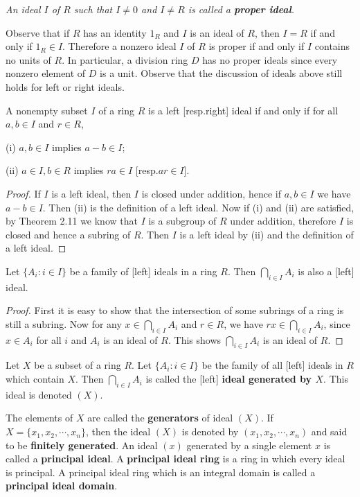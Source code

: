 \begin{note}\em
An ideal $I$ of $R$ such that $I\ne 0$ and $I\ne R$ is called a \textbf{proper ideal}.
\end{note} Observe that if $R$ has an identity $1_R$ and $I$ is an ideal of $R$, then $I=R$ if and only if $1_R\in I$. Therefore a nonzero ideal $I$ of $R$ is proper if and only if $I$ contains no units of $R$. In particular, a division ring $D$ has no proper ideals since every nonzero element of $D$ is a unit. Observe that the discussion of ideals above still holds for left or right ideals.
\begin{theorem}
A nonempty subset $I$ of a ring $R$ is a left [resp.right] ideal if and only if for all $a,b\in I$ and $r\in R$,\par
(i) $a,b\in I$ implies $a-b\in I$;\par
(ii) $a\in I,b\in R$ implies $ra\in I$ [resp.$ar\in I$].
\end{theorem}
\begin{proof}
If $I$ is a left ideal, then $I$ is closed under addition, hence if $a,b\in I$ we have $a-b\in I$. Then (ii) is the definition of a left ideal. Now if (i) and (ii) are satisfied, by Theorem 2.11 we know that $I$ is a subgroup of $R$ under addition, therefore $I$ is closed and hence a subring of $R$. Then $I$ is a left ideal by (ii) and the definition of a left ideal.
\end{proof}
\begin{corollary}
Let $\{A_i:i\in I\}$ be a family of [left] ideals in a ring $R$. Then $\bigcap_{i\in I}A_i$ is also a [left] ideal.
\end{corollary}
\begin{proof}
First it is easy to show that the intersection of some subrings of a ring is still a subring. Now for any $x\in\bigcap_{i\in I}A_i$ and $r\in R$, we have $rx\in\bigcap_{i\in I}A_i$, since $x\in A_i$ for all $i$ and $A_i$ is an ideal of $R$. This shows $\bigcap_{i\in I}A_i$ is an ideal of $R$.
\end{proof}
\begin{definition}
Let $X$ be a subset of a ring $R$. Let $\{A_i:i\in I\}$ be the family of all [left] ideals in $R$ which contain $X$. Then $\bigcap_{i\in I}A_i$ is called the [left] \textbf{ideal generated by $X$}. This ideal is denoted $(X)$.
\end{definition}
The elements of $X$ are called the \textbf{generators} of ideal $(X)$. If $X=\{x_1,x_2,\cdots,x_n\}$, then the ideal $(X)$ is denoted by $(x_1,x_2,\cdots,x_n)$ and said to be \textbf{finitely generated}. An ideal $(x)$ generated by a single element $x$ is called a \textbf{principal ideal}. A \textbf{principal ideal ring} is a ring in which every ideal is principal. A principal ideal ring which is an integral domain is called a \textbf{principal ideal domain}.\par
